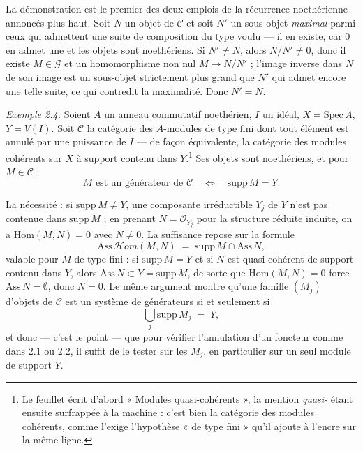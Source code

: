 \documentclass[11pt,a4paper]{article}
\begin{document}
La démonstration est le premier des deux emplois de la récurrence noethérienne
annoncés plus haut. Soit $N$ un objet de $\mathcal{C}$ et soit $N'$ un
sous-objet \emph{maximal} parmi ceux qui admettent une suite de composition du
type voulu — il en existe, car $0$ en admet une et les objets sont noethériens.
Si $N' \neq N$, alors $N/N' \neq 0$, donc il existe $M \in \mathcal{G}$ et un
homomorphisme non nul $M \to N/N'$ ; l'image inverse dans $N$ de son image est
un sous-objet strictement plus grand que $N'$ qui admet encore une telle suite,
ce qui contredit la maximalité. Donc $N' = N$.

\emph{Exemple 2.4.} Soient $A$ un anneau commutatif noethérien, $I$ un idéal,
$X = \mathrm{Spec}\, A$, $Y = V(I)$. Soit $\mathcal{C}$ la catégorie des
$A$-modules de type fini dont tout élément est annulé par une puissance de $I$
— de façon équivalente, la catégorie des modules cohérents sur $X$ à support
contenu dans $Y$.\footnote{Le feuillet écrit d'abord « Modules quasi-cohérents », la mention
\emph{quasi-} étant ensuite surfrappée à la machine : c'est
bien la catégorie des modules cohérents, comme l'exige l'hypothèse « de type
fini » qu'il ajoute à l'encre sur la même ligne.} Ses objets sont noethériens,
et pour $M \in \mathcal{C}$ :
\[
  M \text{ est un générateur de } \mathcal{C}
  \quad\Longleftrightarrow\quad
  \mathrm{supp}\, M = Y .
\]

La nécessité : si $\mathrm{supp}\, M \neq Y$, une composante irréductible
$Y_{j}$ de $Y$ n'est pas contenue dans $\mathrm{supp}\, M$ ; en prenant
$N = \mathcal{O}_{Y_{j}}$ pour la structure réduite induite, on a
$\mathrm{Hom}(M,N) = 0$ avec $N \neq 0$. La suffisance repose sur la formule
\[
  \mathrm{Ass}\,\mathcal{H}om(M,N) \;=\; \mathrm{supp}\, M \cap \mathrm{Ass}\, N ,
\]
valable pour $M$ de type fini : si $\mathrm{supp}\, M = Y$ et si $N$ est
quasi-cohérent de support contenu dans $Y$, alors $\mathrm{Ass}\, N \subset Y =
\mathrm{supp}\, M$, de sorte que $\mathrm{Hom}(M,N) = 0$ force
$\mathrm{Ass}\, N = \emptyset$, donc $N = 0$. Le même argument montre qu'une
famille $(M_{j})$ d'objets de $\mathcal{C}$ est un système de générateurs si et
seulement si
\[
  \bigcup_{j} \mathrm{supp}\, M_{j} \;=\; Y ,
\]
et donc — c'est le point — que pour vérifier l'annulation d'un foncteur comme
dans 2.1 ou 2.2, il suffit de le tester sur les $M_{j}$, en particulier sur un
seul module de support $Y$.
\end{document}

